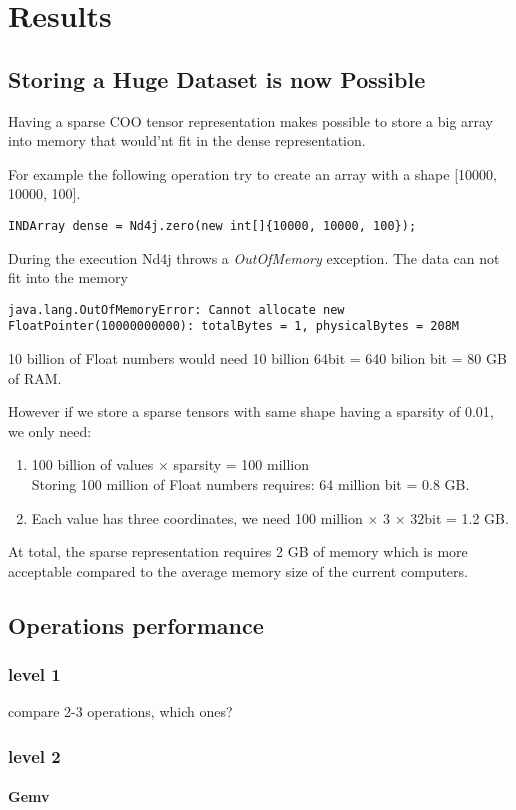 \chapter{Results}

\section{Storing a Huge Dataset is now Possible}

Having a sparse COO tensor representation makes possible to store a big array into memory that would'nt fit in the dense representation.

For example the following operation try to create an array with a shape [10000, 10000, 100]. 

\begin{lstlisting}[style=nonumbers]
	INDArray dense = Nd4j.zero(new int[]{10000, 10000, 100});
\end{lstlisting}

During the execution Nd4j throws a \textit{OutOfMemory} exception. The data can not fit into the memory
\begin{lstlisting}[style=nonumbers]
	java.lang.OutOfMemoryError: Cannot allocate new FloatPointer(10000000000): totalBytes = 1, physicalBytes = 208M
\end{lstlisting}

10 billion of Float numbers would need 10 billion \time 64bit = 640 bilion bit = 80 GB of RAM.

However if we store a sparse tensors with same shape having a sparsity of 0.01, we only need:
\begin{enumerate}
	\item 100 billion of values $\times$ sparsity = 100 million \\
	Storing 100 million of Float numbers requires: 64 million bit = 0.8 GB.\\
	\item Each value has three coordinates, we need 100 million $\times$ 3 $\times$ 32bit = 1.2 GB.
		
\end{enumerate}
	At total, the sparse representation requires 2 GB of memory which is more acceptable compared to the average memory size of the current computers.



\section{Operations performance}

\subsection{level 1}
compare 2-3 operations, which ones?
\subsection{level 2}
\subsubsection{Gemv}